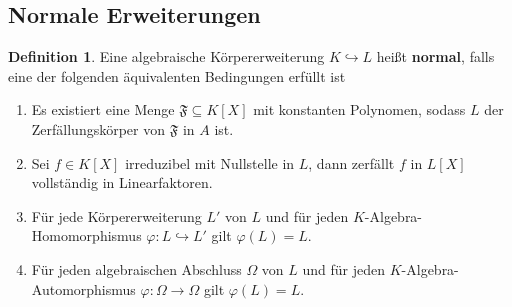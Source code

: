 \documentclass[10pt,a4paper]{article}
\newcounter{thm}[section]
\theoremstyle{definition}
\newtheorem{definition}[thm]{Definition}
\theoremstyle{plain}
\theoremstyle{remark}
\begin{document}
\subsection{Normale Erweiterungen}
\begin{definition}\label{906}
	Eine algebraische Körpererweiterung $K\hookrightarrow L$ heißt \textbf{normal}, falls eine der folgenden äquivalenten Bedingungen erfüllt ist\\
	\begin{enumerate}
		\item Es existiert eine Menge $\mathfrak F\subseteq K[X]$ mit konstanten Polynomen, sodass $L$ der Zerfällungskörper von $\mathfrak F$ in $A$ ist.
		\item Sei $f\in K[X]$ irreduzibel mit Nullstelle in $L$, dann zerfällt $f$ in $L[X]$ vollständig in Linearfaktoren.
		\item Für jede Körpererweiterung $L'$ von $L$ und für jeden $K$-Algebra-Homomorphismus $\varphi:L\hookrightarrow L'$ gilt $\varphi(L)=L$.
		\item Für jeden algebraischen Abschluss $\Omega$ von $L$ und für jeden $K$-Algebra-Automorphismus $\varphi:\Omega\rightarrow \Omega$ gilt $\varphi(L)=L$.
	\end{enumerate}
\end{definition}
\end{document}
